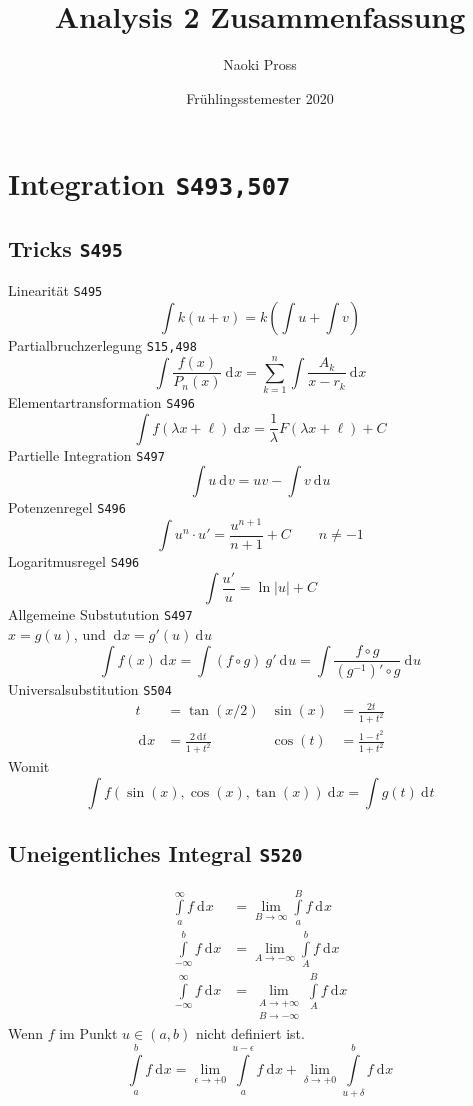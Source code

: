 \documentclass[a4paper, twocolumn]{article}
\title{Analysis 2 Zusammenfassung}
\author{Naoki Pross}
\date{Fr\"uhlingsstemester 2020}
\numberwithin{equation}{subsection}
\newcommand{\dd}[2][]{\ensuremath{~\mathrm{d}^{#1} #2}}
\newcommand{\brpage}[1]{\textcolor{red!70!black}{\small\texttt{S#1}}}
\begin{document}
\section{Integration \brpage{493,507}}
\subsection{Tricks \brpage{495}}
Linearit\"at \brpage{495}
\[
    \int k(u + v) = k\left(\int u + \int v\right)
\]
Partialbruchzerlegung \brpage{15,498}
\[
    \int \frac{f(x)}{P_n(x)} \dd{x} = \sum_{k=1}^n \int \frac{A_k}{x-r_k}\dd{x}
\]
Elementartransformation \brpage{496}
\[
    \int f(\lambda x + \ell) \dd{x} = \frac{1}{\lambda} F(\lambda x + \ell) + C
\]
Partielle Integration \brpage{497}
\[
    \int u \dd{v} = uv - \int v \dd{u}
\]
Potenzenregel \brpage{496}
\[
    \int u^n \cdot u' = \frac{u^{n+1}}{n+1} + C \qquad n \neq -1
\]
Logaritmusregel \brpage{496}
\[
    \int \frac{u'}{u} = \ln|u| + C
\]
Allgemeine Substutution \brpage{497}\\
 \(x = g(u)\), und \(\dd{x} = g'(u)\dd{u}\)
\[
    \int f(x) \dd{x} = \int (f\circ g) ~ g' \dd{u} = \int \frac{f \circ g}{(g^{-1})'\circ g} \dd{u} 
\]
Universalsubstitution \brpage{504}
\begin{align*}
    t &= \tan(x/2) & \sin(x) &= \frac{2t}{1+t^2} \\
    \dd{x} &= \frac{2\dd{t}}{1+t^2} & \cos(t) &= \frac{1-t^2}{1+t^2} 
\end{align*}
Womit
\[
    \int f(\sin(x), \cos(x), \tan(x)) \dd{x} = \int g(t) \dd{t}
\]

\subsection{Uneigentliches Integral \brpage{520}}
\begin{align*}
    \int\limits_a^\infty f \dd{x} &= \lim_{B \to \infty} \int\limits_a^B f \dd{x} \\
    \int\limits_{-\infty}^b f \dd{x} &= \lim_{A \to -\infty} \int\limits_A^b f \dd{x} \\
    \int\limits_{-\infty}^\infty f \dd{x} &= \lim_{\substack{A \to +\infty \\ B \to -\infty}} \int\limits_A^B f \dd{x}
\end{align*}
Wenn \(f\) im Punkt \(u \in (a,b)\) nicht definiert ist.
\begin{equation} \label{eqn:int-with-pole}
    \int\limits_a^b f \dd{x} = 
    \lim_{\epsilon\to +0} \int\limits_a^{u-\epsilon} f \dd{x}
    + \lim_{\delta\to +0} \int\limits_{u+\delta}^b f \dd{x}
\end{equation}
\end{document}
